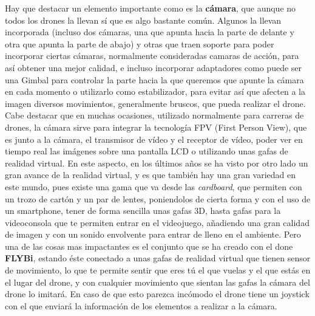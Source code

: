 \hspace{1 cm} Hay que destacar un elemento importante como es la \textbf{c\'amara}, que aunque no todos los drones la llevan s\'i que es algo bastante com\'un. Algunos la llevan incorporada (incluso dos c\'amaras, una que apunta hacia la parte de delante y otra que apunta la parte de abajo) y otras que traen soporte para poder incorporar ciertas c\'amaras, normalmente consideradas camaras de acci\'on, para as\'i obtener una mejor calidad, e incluso incorporar adaptadores como puede ser una Gimbal para controlar la parte hacia la que queremos que apunte la c\'amara en cada momento o utilizarlo como estabilizador, para evitar as\'i que afecten a la imagen diversos movimientos, generalmente bruscos, que pueda realizar el drone. Cabe destacar que en muchas ocasiones, utilizado normalmente para carreras de drones, la c\'amara sirve para integrar la tecnolog\'ia FPV (First Person View), que es junto a la c\'amara, el transmisor de v\'ideo y el receptor de v\'ideo, poder ver en tiempo real las im\'agenes sobre una pantalla LCD o utilizando unas gafas de realidad virtual. En este aspecto, en los \'ultimos años se ha visto por otro lado un gran avance de la realidad virtual, y es que tambi\'en hay una gran variedad en este mundo, pues existe una gama que va desde las \emph{cardboard}, que permiten con un trozo de cart\'on y un par de lentes, poniendolos de cierta forma y con el uso de un smartphone, tener de forma sencilla unas gafas 3D, hasta gafas para la videoconsola que te permiten entrar en el videojuego, añadiendo una gran calidad de imagen y con un sonido envolvente para entrar de lleno en el ambiente. Pero una de las cosas mas impactantes es el conjunto que se ha creado con el done \textbf{FLYBi}, estando \'este conectado a unas gafas de realidad virtual que tienen sensor de movimiento, lo que te permite sentir que eres t\'u el que vuelas y el que est\'as en el lugar del drone, y con cualquier movimiento que sientan las gafas la c\'amara del drone lo imitar\'a. En caso de que esto parezca inc\'omodo el drone tiene un joystick con el que enviar\'a la informaci\'on de los elementos a realizar a la c\'amara. 
 

